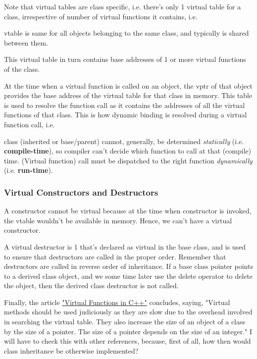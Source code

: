 \documentclass[10pt]{amsart}
\begin{document}
Note that virtual tables are class specific, i.e. there's only 1 virtual table for a class, irrespective of number of virtual functions it contains, i.e.  

vtable is same for all objects belonging to the same class, and typically is shared between them.    
  

This virtual table in turn contains base addresses of 1 or more virtual functions of the class.  

At the time when a virtual function is called on an object, the vptr of that object provides the base address of the virtual table for that class in memory.  This table is used to resolve the function call as it contains the addresses of all the virtual functions of that class.  This is how dynamic binding is resolved during a virtual function call, i.e.  

class (inherited or base/parent) cannot, generally, be determined \emph{statically} (i.e. \textbf{compile-time}), so compiler can't decide which function to call at that (compile) time.  (Virtual function) call must be dispatched to the right function \emph{dynamically} (i.e. \textbf{run-time}).  



\subsubsection{Virtual Constructors and Destructors}  

A constructor cannot be virtual because at the time when constructor is invoked, the vtable wouldn't be available in memory.  Hence, we can't have a virtual constructor.  

A virtual destructor is 1 that's declared as virtual in the base class, and is used to ensure that destructors are called in the proper order.  Remember that destructors are called in reverse order of inheritance.  If a base class pointer points to a derived class object, and we some time later use the delete operator to delete the object, then the derived class destructor is not called.  

Finally, the article \href{http://wayback.archive.org/web/20100209040010/http://www.codersource.net/published/view/325/virtual_functions_in.aspx}{"Virtual Functions in C++"} concludes, saying, "Virtual methods should be used judiciously as they are slow due to the overhead involved in searching the virtual table. They also increase the size of an object of a class by the size of a pointer. The size of a pointer depends on the size of an integer."  I will have to check this with other references, because, first of all, how then would class inheritance be otherwise implemented?  
\end{document}
